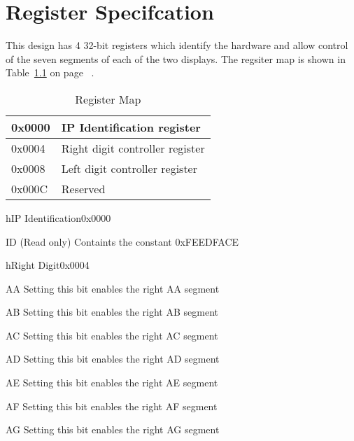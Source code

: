 \documentclass{report}
\begin{document}
\chapter{Register Specifcation}
This design has 4 32-bit registers which identify the hardware and allow control
of the seven segments of each of the two displays.  The regsiter map is shown in
Table~\ref{table:bar0regmap} on page
~\pageref{table:bar0regmap}.  

\begin{table}[h]
\begin{tabular}{||l|l||}
\hline
 0x0000 & IP Identification register\\
\hline
 0x0004 & Right digit controller register \\
\hline
 0x0008 & Left digit controller register \\
\hline
 0x000C & Reserved \\
\hline
\end{tabular}
\caption{Register Map}
\label{table:bar0regmap}
\end{table}



\begin{register}{h}{IP Identification}{0x0000}%
\label{ID}%
\regnewline%
\begin{regdesc}\begin{reglist}
\item [ID](Read only) Containts the constant 0xFEEDFACE 
\end{reglist}\end{regdesc}\end{register}

\begin{register}{h}{Right Digit}{0x0004}%
\label{RD}%
%
%
%
%
%
%
%
%
\regnewline%
\begin{regdesc}\begin{reglist}
\item [AA]Setting this bit enables the right AA segment
\item [AB]Setting this bit enables the right AB segment
\item [AC]Setting this bit enables the right AC segment
\item [AD]Setting this bit enables the right AD segment
\item [AE]Setting this bit enables the right AE segment
\item [AF]Setting this bit enables the right AF segment
\item [AG]Setting this bit enables the right AG segment
\end{reglist}\end{regdesc}\end{register}
\end{document}
